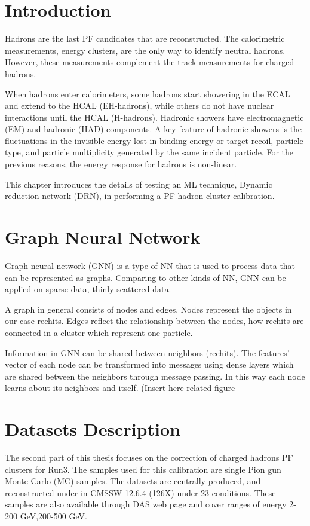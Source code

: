 \section{Introduction}
Hadrons are the last PF candidates that are reconstructed. The calorimetric measurements, energy clusters, are the only way to identify neutral hadrons. However, these measurements complement the track measurements for charged hadrons.

When hadrons enter calorimeters, some hadrons start showering in the ECAL and extend to the HCAL (EH-hadrons), while others do not have nuclear interactions until the HCAL (H-hadrons). Hadronic showers have electromagnetic (EM) and hadronic (HAD) components. A key feature of hadronic showers is the fluctuations in the invisible energy lost in binding energy or target recoil, particle type, and particle multiplicity generated by the same incident particle.%
For the previous reasons, the energy response for hadrons is non-linear.   

This chapter introduces the details of testing an ML technique, Dynamic reduction network (DRN), in performing a PF hadron cluster calibration.

\section{Graph Neural Network} %
Graph neural network (GNN) is a type of NN that is used to process data that can be represented as graphs. Comparing to other kinds of NN, GNN can be applied on sparse data, thinly scattered data.

A graph in general consists of nodes and edges. Nodes represent the objects in our case rechits. Edges reflect the relationship between the nodes, how rechits are connected in a cluster which represent one particle.

Information in GNN can be shared between neighbors (rechits). The features’ vector of each node can be transformed into messages using dense layers which are shared between the neighbors through message passing. In this way each node learns about its neighbors and itself. (Insert here related figure %

\section{Datasets Description}
The second part of this thesis focuses on the correction of charged hadrons PF clusters for Run3. The samples used for this calibration are single Pion gun Monte Carlo (MC) samples. The datasets are centrally produced, and reconstructed under in CMSSW 12.6.4 (126X) under 23 conditions. These samples are also available through DAS web page and cover ranges of energy 2-200 GeV,200-500 GeV.

